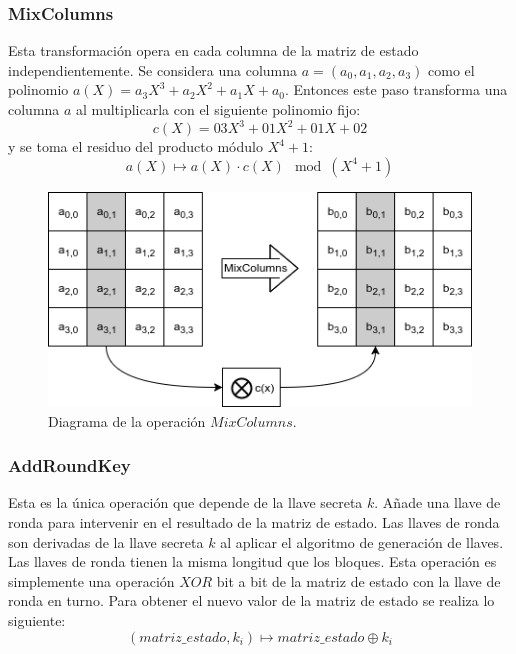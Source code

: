 \subsubsection{MixColumns}
Esta transformación opera en cada columna de la matriz de estado
independientemente. Se considera una columna $a = (a_0, a_1, a_2, a_3)$
como el polinomio $a(X) = a_3X^3 + a_2X^2 + a_1X + a_0$.
Entonces este paso transforma una columna $a$ al multiplicarla con el
siguiente polinomio fijo:
\begin{equation}
  \label{cifrado_aes_poli}
  c(X) = 03X^3 + 01X^2 + 01X+ 02
\end{equation}
y se toma el residuo del producto módulo $X^4+1$:
\begin{equation}
  \label{cifrado_aes_mix}
  a(X) \mapsto a(X) \cdotp c(X) \mod (X^4+1)
\end{equation}

\begin{figure}[H]
  \begin{center}
    \includegraphics[width=0.6\linewidth]
      {contenidos/antecedentes/bloques/diagramas/mixColumns}
     \caption{Diagrama de la operación $MixColumns$.}
   \end{center}
\end{figure}

\subsubsection{AddRoundKey}
Esta es la única operación que depende de la llave secreta $k$. Añade una
llave de ronda para intervenir en el resultado de la matriz de estado.
Las llaves de ronda son derivadas de la llave secreta $k$ al aplicar el
algoritmo de generación de llaves. Las llaves de ronda tienen la misma
longitud que los bloques. Esta operación es simplemente una operación
$XOR$ bit a bit de la matriz de estado con la llave de ronda en turno.
Para obtener el nuevo valor de la matriz de estado se realiza lo
siguiente:
\begin{equation}
  \label{cifrado_aes_addkey}
  (matriz\_estado, k_i) \mapsto matriz\_estado \oplus k_i
\end{equation}

